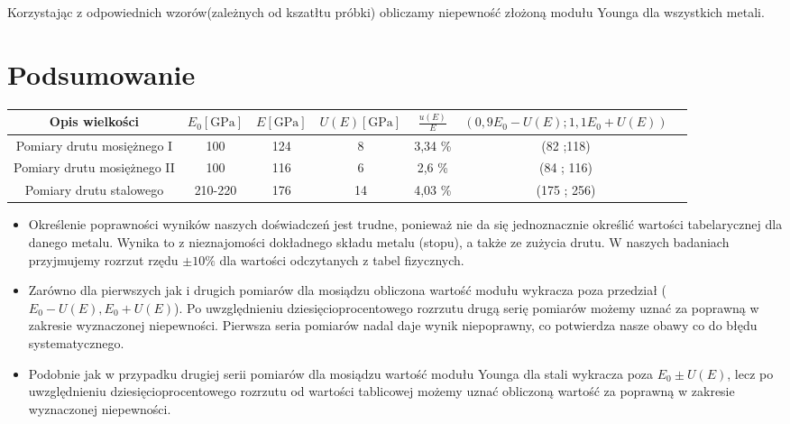 \documentclass [a4paper,11pt]{article}
\begin{document}
	Korzystając z odpowiednich wzorów(zależnych od kszatłtu próbki) obliczamy niepewność złożoną modułu Younga dla wszystkich metali. 

		

	\section{Podsumowanie}
	\begin{center}
		\begin{tabular}{|c|c|c|c|c|c|c|}
			\hline Opis wielkości & $ E_0 \left[ \text{GPa} \right]$ & $E \left[ \text{GPa} \right]$ & $U(E) \left[ \text{GPa} \right]$ & $ \frac{u(E)}{E} $& $(0,9E_0-U(E); 1,1E_0 + U(E))$\\
			\hline Pomiary drutu mosiężnego I & 100 & 124 & 8 & 3,34 \% & (82 ;118) \\
			\hline Pomiary drutu mosiężnego II & 100 & 116 & 6 & 2,6 \% & (84 ; 116) \\  
			\hline Pomiary drutu stalowego & 210-220 & 176  & 14 &  4,03 \% & (175 ; 256)\\ 
			\hline 
		\end{tabular} 
	\end{center}
\vspace{1em}

\begin{itemize}
	\item Określenie poprawności wyników naszych doświadczeń jest trudne, ponieważ nie da się jednoznacznie określić wartości tabelarycznej dla danego metalu. Wynika to z nieznajomości dokładnego składu metalu (stopu), a także ze zużycia drutu. W naszych badaniach przyjmujemy rozrzut rzędu $\pm10\%$ dla wartości odczytanych z tabel fizycznych.
	
	\item Zarówno dla pierwszych jak i drugich pomiarów dla mosiądzu obliczona wartość modułu wykracza poza przedział ($E_0-U(E), E_0+U(E)$). Po uwzględnieniu dziesięcioprocentowego rozrzutu drugą serię pomiarów możemy uznać za poprawną w zakresie wyznaczonej niepewności. Pierwsza seria pomiarów nadal daje wynik niepoprawny, co potwierdza nasze obawy co do błędu systematycznego.
	
	\item Podobnie jak w przypadku drugiej serii pomiarów dla mosiądzu wartość modułu Younga dla stali wykracza poza $E_0 \pm U(E)$, lecz po uwzględnieniu dziesięcioprocentowego rozrzutu od wartości tablicowej możemy uznać obliczoną wartość za poprawną w zakresie wyznaczonej niepewności.
	
\end{itemize}
\end{document}
